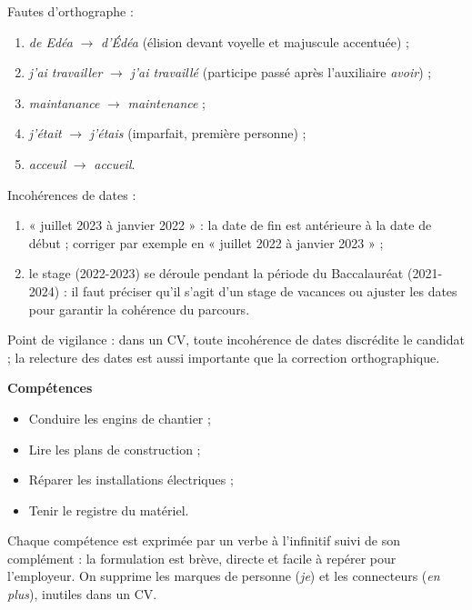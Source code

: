 \documentclass[11pt]{article}
\newcommand{\cle}[1]{{\popxbold\color{popdark}#1}}
\begin{document}
\begin{corrige}
Fautes d'orthographe :
\begin{enumerate}
\item \emph{de Edéa} $\rightarrow$ \emph{d'Édéa} (élision devant voyelle et majuscule accentuée) ;
\item \emph{j'ai travailler} $\rightarrow$ \emph{j'ai travaillé} (participe passé après l'auxiliaire \emph{avoir}) ;
\item \emph{maintanance} $\rightarrow$ \emph{maintenance} ;
\item \emph{j'était} $\rightarrow$ \emph{j'étais} (imparfait, première personne) ;
\item \emph{acceuil} $\rightarrow$ \emph{accueil}.
\end{enumerate}
Incohérences de dates :
\begin{enumerate}
\item « juillet 2023 à janvier 2022 » : la date de fin est antérieure à la date de début ; corriger par exemple en « juillet 2022 à janvier 2023 » ;
\item le stage (2022-2023) se déroule pendant la période du Baccalauréat (2021-2024) : il faut préciser qu'il s'agit d'un stage de vacances ou ajuster les dates pour garantir la cohérence du parcours.
\end{enumerate}
Point de vigilance : dans un CV, toute incohérence de dates discrédite le candidat ; la relecture des dates est aussi importante que la correction orthographique.
\end{corrige}

\begin{corrige}
\textbf{Compétences}
\begin{itemize}
\item Conduire les engins de chantier ;
\item Lire les plans de construction ;
\item Réparer les installations électriques ;
\item Tenir le registre du matériel.
\end{itemize}
Chaque compétence est exprimée par un verbe à l'\cle{infinitif} suivi de son complément : la formulation est brève, directe et facile à repérer pour l'employeur. On supprime les marques de personne (\emph{je}) et les connecteurs (\emph{en plus}), inutiles dans un CV.
\end{corrige}
\end{document}

